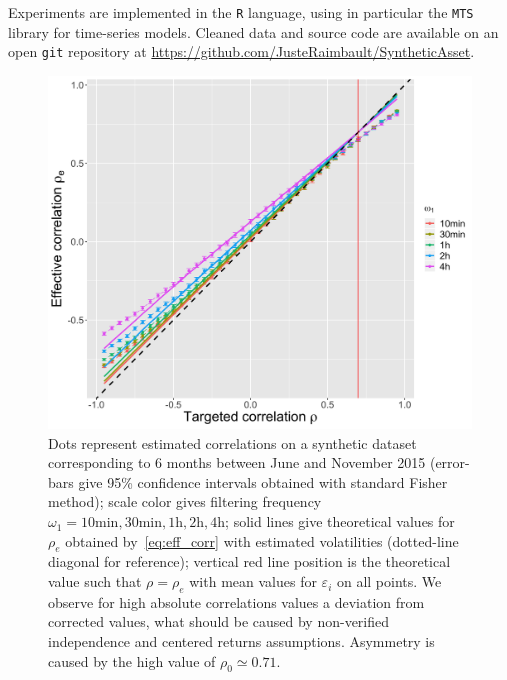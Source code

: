 \documentclass{bmcart}
\providecommand{\DIFaddtex}[1]{{\protect\color{blue}\uwave{#1}}} %
\providecommand{\DIFaddbegin}{} %
\providecommand{\DIFaddend}{} %
\providecommand{\DIFdelbegin}{} %
\providecommand{\DIFdelend}{} %
\providecommand{\DIFaddFL}[1]{\DIFadd{#1}} %
\providecommand{\DIFaddbeginFL}{} %
\providecommand{\DIFaddendFL}{} %
\providecommand{\DIFdelbeginFL}{} %
\providecommand{\DIFdelendFL}{} %
\providecommand{\DIFadd}[1]{\texorpdfstring{\DIFaddtex{#1}}{#1}} %
\newcommand{\DIFscaledelfig}{0.5}
\newlength{\DIFdelgraphicswidth} %
\newlength{\DIFdelgraphicsheight} %
\newcommand{\DIFaddincludegraphics}[2][]{{\color{blue}\fbox{\DIFOincludegraphics[#1]{#2}}}} %
\newcommand{\DIFdelincludegraphics}[2][]{%
\sbox{\DIFdelgraphicsbox}{\DIFOincludegraphics[#1]{#2}}%
\settoboxwidth{\DIFdelgraphicswidth}{\DIFdelgraphicsbox} %
\settoboxtotalheight{\DIFdelgraphicsheight}{\DIFdelgraphicsbox} %
\scalebox{\DIFscaledelfig}{%
\parbox[b]{\DIFdelgraphicswidth}{\usebox{\DIFdelgraphicsbox}\\[-\baselineskip] \rule{\DIFdelgraphicswidth}{0em}}\llap{\resizebox{\DIFdelgraphicswidth}{\DIFdelgraphicsheight}{%
\setlength{\unitlength}{\DIFdelgraphicswidth}%
\begin{picture}(1,1)%
\thicklines\linethickness{2pt} %
{\color[rgb]{1,0,0}\put(0,0){\framebox(1,1){}}}%
{\color[rgb]{1,0,0}\put(0,0){\line( 1,1){1}}}%
{\color[rgb]{1,0,0}\put(0,1){\line(1,-1){1}}}%
\end{picture}%
}\hspace*{3pt}}} %
} %
\DeclareRobustCommand{\DIFaddbegin}{\DIFOaddbegin \let\includegraphics\DIFaddincludegraphics} %
\DeclareRobustCommand{\DIFaddend}{\DIFOaddend \let\includegraphics\DIFOincludegraphics} %
\DeclareRobustCommand{\DIFdelbegin}{\DIFOdelbegin \let\includegraphics\DIFdelincludegraphics} %
\DeclareRobustCommand{\DIFdelend}{\DIFOaddend \let\includegraphics\DIFOincludegraphics} %
\DeclareRobustCommand{\DIFaddbeginFL}{\DIFOaddbeginFL \let\includegraphics\DIFaddincludegraphics} %
\DeclareRobustCommand{\DIFaddendFL}{\DIFOaddendFL \let\includegraphics\DIFOincludegraphics} %
\DeclareRobustCommand{\DIFdelbeginFL}{\DIFOdelbeginFL \let\includegraphics\DIFdelincludegraphics} %
\DeclareRobustCommand{\DIFdelendFL}{\DIFOaddendFL \let\includegraphics\DIFOincludegraphics} %
\begin{document}

\DIFdelend Experiments are implemented in the \texttt{R} language, using in particular the \texttt{MTS}~\cite{Tsay:2015xy} library for time-series models. Cleaned data and source code are available on an open \texttt{git} repository at \DIFdelbegin %
\DIFdelend \DIFaddbegin \url{https://github.com/JusteRaimbault/SyntheticAsset}\DIFaddend .



\begin{figure}[h!]
\centering
\DIFdelbeginFL %
\DIFdelendFL \DIFaddbeginFL \includegraphics[width=\linewidth]{figures/Fig4.png}
\DIFaddendFL \caption{ Dots represent estimated correlations on a synthetic dataset corresponding to 6 months between June and November 2015 (error-bars give 95\% confidence intervals obtained with standard Fisher method); scale color gives \DIFaddbeginFL \DIFaddFL{the }\DIFaddendFL filtering frequency $\omega_1=10\textrm{min},30\textrm{min},1\textrm{h},2\textrm{h},4\textrm{h}$; solid lines give \DIFaddbeginFL \DIFaddFL{the }\DIFaddendFL theoretical values for $\rho_e$ obtained by~\ref{eq:eff_corr} with estimated volatilities (dotted-line diagonal for reference); vertical red line position is the theoretical value such that $\rho = \rho_e$ with mean values for $\varepsilon_i$ on all points. We observe for high absolute correlations values a deviation from corrected values, what should be caused by non-verified independence and centered returns assumptions. Asymmetry is caused by the high value of $\rho_0 \simeq 0.71$.}
\label{fig:effective_corrs}
\end{figure}
\end{document}
